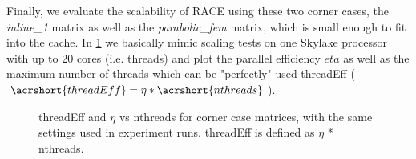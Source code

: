 Finally, we evaluate the scalability of RACE using these two corner cases, the \emph{inline\_1} matrix as well as the \emph{parabolic\_fem} matrix, which is small enough to fit into the cache. 
In \cref{fig:corner_cases_param} we basically mimic scaling tests on one Skylake processor with up to 20 cores (i.e. threads) and plot the parallel efficiency $eta$ as well as the maximum number of threads which can be "perfectly" used \acrshort{threadEff} (\ie $\acrshort{threadEff} = \eta*\acrshort{nthreads}$). 
%
\begin{figure}[tbhp]
	\centering
	\caption{\acrshort{threadEff} and $\eta$ vs \acrshort{nthreads} for corner case matrices, with the same settings used in experiment runs. \acrshort{threadEff} is defined as $\eta$ * \acrshort{nthreads}.}
	\label{fig:corner_cases_param}
\end{figure}

